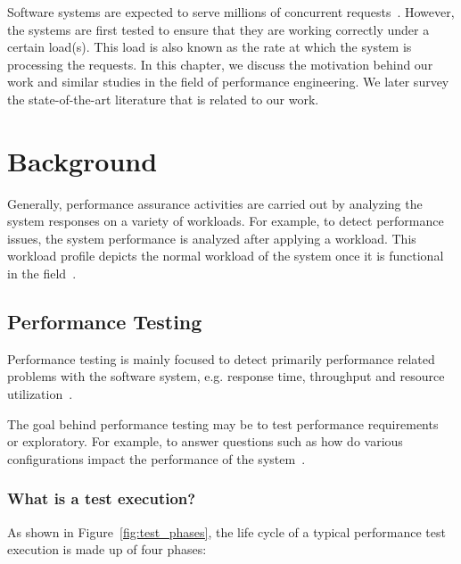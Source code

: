

Software systems are expected to serve millions of concurrent requests~\cite{arlitt2000workload}. However, the systems are first tested to ensure that they are working correctly under a certain load(s). This load is also known as the rate at which the system is processing the requests. 
In this chapter, we discuss the motivation behind our work and similar studies in the field of performance engineering. We later survey the state-of-the-art literature that is related to our work.

\section{Background}

Generally, performance assurance activities are carried out by analyzing the system responses on a variety of workloads. For example, to detect performance issues, the system performance is analyzed after applying a workload. This workload profile depicts the normal workload of the system once it is functional in the field~\cite{464549}.


\subsection{Performance Testing}

Performance testing is mainly focused to detect primarily performance related problems with the software system, e.g. response time, throughput and resource utilization~\cite{Barna:2011,6032540,Gorton}.

The goal behind performance testing may be to test performance requirements~\cite{pozin2011models} or exploratory. For example, to answer questions such as how do various configurations impact the performance of the system~\cite{Menasce:2000,Menasce:1994,Menasce:2001,pozin2011models}.

\subsubsection{What is a test execution?}

As shown in Figure~\ref{fig:test_phases}, the life cycle of a typical performance test execution is made up of four phases:

